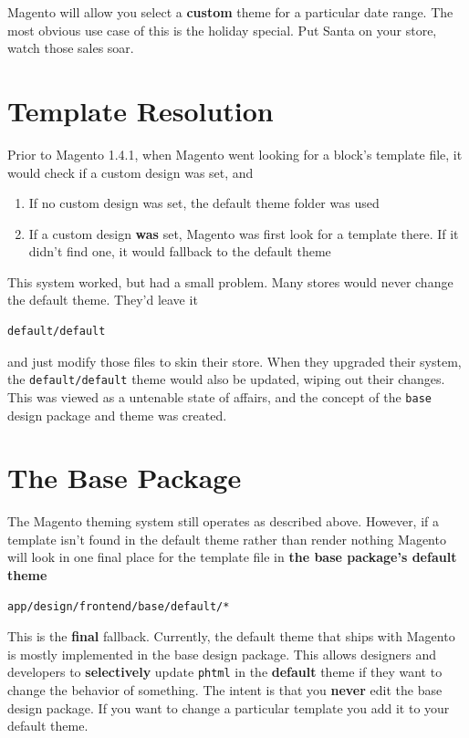 \documentclass[oneside]{book}
\begin{document}
Magento will allow you select a \textbf{custom} theme for a particular date range.   The most obvious use case of this is the holiday special.  Put Santa on your store, watch those sales soar.

\section{Template Resolution}

Prior to Magento 1.4.1, when Magento went looking for a block's template file, it would check if a custom design was set, and

\begin{enumerate}
\item If no custom design was set, the default theme folder was used
\item If a custom design \textbf{was} set, Magento was first look for a template there.  If it didn't find one, it would fallback to the default theme
\end{enumerate}


This system worked, but had a small problem.  Many stores would never change the default theme.  They'd leave it

\begin{lstlisting}
default/default

\end{lstlisting}


and just modify those files to skin their store.  When they upgraded their system, the \footnotesize\texttt{default/default} \normalsize  theme would also be updated, wiping out their changes.  This was viewed as a untenable state of affairs, and the concept of the \footnotesize\texttt{base} \normalsize  design package and theme was created.

\section{The Base Package}

The Magento theming system still operates as described above. However, if a template isn't found in the default theme rather than render nothing Magento will look in one final place for the template file in \textbf{the base package's default theme}

\begin{lstlisting}
app/design/frontend/base/default/*

\end{lstlisting}


This is the \textbf{final} fallback.  Currently, the default theme that ships with Magento is mostly implemented in the base design package. This allows designers and developers to \textbf{selectively} update \footnotesize\texttt{phtml} \normalsize  in the \textbf{default} theme if they want to change the behavior of something.  The intent is that you \textbf{never} edit the base design package.  If you want to change a particular template you add it to your default theme.
\end{document}
